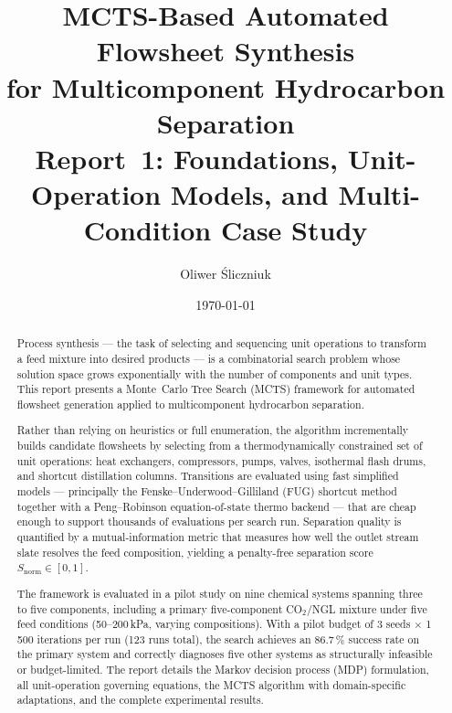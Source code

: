 \documentclass[11pt,a4paper]{article}
\theoremstyle{definition}
\theoremstyle{plain}
\begin{document}
\title{\textbf{MCTS-Based Automated Flowsheet Synthesis\\
for Multicomponent Hydrocarbon Separation}\\[6pt]
\large Report~1: Foundations, Unit-Operation Models,
and Multi-Condition Case Study}

\author{
 Oliwer \'{S}liczniuk\\[2pt]
}

\date{\today}

\maketitle
\tableofcontents
\newpage

\begin{abstract}
Process synthesis — the task of selecting and sequencing unit operations to transform a feed mixture into desired products — is a combinatorial search problem whose solution space grows exponentially with the number of components and unit types. This report presents a Monte~Carlo Tree Search (MCTS) framework for automated flowsheet generation applied to multicomponent hydrocarbon separation.

Rather than relying on heuristics or full enumeration, the algorithm incrementally builds candidate flowsheets by selecting from a thermodynamically constrained set of unit operations: heat exchangers, compressors, pumps, valves, isothermal flash drums, and shortcut distillation columns. Transitions are evaluated using fast simplified models — principally the Fenske--Underwood--Gilliland (FUG) shortcut method together with a Peng--Robinson equation-of-state thermo backend — that are cheap enough to support thousands of evaluations per search run. Separation quality is quantified by a mutual-information metric that measures how well the outlet stream slate resolves the feed composition, yielding a penalty-free separation score $S_{\mathrm{norm}} \in [0,1]$.

The framework is evaluated in a pilot study on nine chemical systems spanning three to five components, including a primary five-component CO$_2$/NGL mixture under five feed conditions (50--200\,kPa, varying compositions). With a pilot budget of 3 seeds $\times$ 1\,500 iterations per run (123 runs total), the search achieves an 86.7\,\% success rate on the primary system and correctly diagnoses five other systems as structurally infeasible or budget-limited. The report details the Markov decision process (MDP) formulation, all unit-operation governing equations, the MCTS algorithm with domain-specific adaptations, and the complete experimental results.
\end{abstract}
\end{document}
